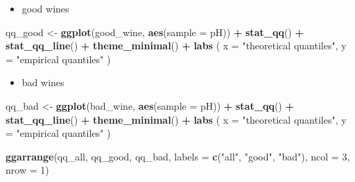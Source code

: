 \documentclass[
]{article}
\newenvironment{Shaded}{\begin{snugshade}}{\end{snugshade}}
\newcommand{\AttributeTok}[1]{\textcolor[rgb]{0.13,0.29,0.53}{#1}}
\newcommand{\DecValTok}[1]{\textcolor[rgb]{0.00,0.00,0.81}{#1}}
\newcommand{\FunctionTok}[1]{\textcolor[rgb]{0.13,0.29,0.53}{\textbf{#1}}}
\newcommand{\NormalTok}[1]{#1}
\newcommand{\OtherTok}[1]{\textcolor[rgb]{0.56,0.35,0.01}{#1}}
\newcommand{\SpecialCharTok}[1]{\textcolor[rgb]{0.81,0.36,0.00}{\textbf{#1}}}
\newcommand{\StringTok}[1]{\textcolor[rgb]{0.31,0.60,0.02}{#1}}
\providecommand{\tightlist}{%
  \setlength{\itemsep}{0pt}\setlength{\parskip}{0pt}}
\begin{document}
\begin{itemize}
\tightlist
\item
  good wines
\end{itemize}

\begin{Shaded}
\begin{Highlighting}[]
\NormalTok{qq\_good }\OtherTok{\textless{}{-}} \FunctionTok{ggplot}\NormalTok{(good\_wine, }\FunctionTok{aes}\NormalTok{(}\AttributeTok{sample =}\NormalTok{ pH)) }\SpecialCharTok{+}
  \FunctionTok{stat\_qq}\NormalTok{() }\SpecialCharTok{+}
  \FunctionTok{stat\_qq\_line}\NormalTok{() }\SpecialCharTok{+}
  \FunctionTok{theme\_minimal}\NormalTok{() }\SpecialCharTok{+}
  \FunctionTok{labs}\NormalTok{ (}
    \AttributeTok{x =} \StringTok{"theoretical quantiles"}\NormalTok{,}
    \AttributeTok{y =} \StringTok{"empirical quantiles"}
\NormalTok{  )}
\end{Highlighting}
\end{Shaded}

\begin{itemize}
\tightlist
\item
  bad wines
\end{itemize}

\begin{Shaded}
\begin{Highlighting}[]
\NormalTok{qq\_bad }\OtherTok{\textless{}{-}} \FunctionTok{ggplot}\NormalTok{(bad\_wine, }\FunctionTok{aes}\NormalTok{(}\AttributeTok{sample =}\NormalTok{ pH)) }\SpecialCharTok{+}
  \FunctionTok{stat\_qq}\NormalTok{() }\SpecialCharTok{+}
  \FunctionTok{stat\_qq\_line}\NormalTok{() }\SpecialCharTok{+}
  \FunctionTok{theme\_minimal}\NormalTok{() }\SpecialCharTok{+}
  \FunctionTok{labs}\NormalTok{ (}
    \AttributeTok{x =} \StringTok{"theoretical quantiles"}\NormalTok{,}
    \AttributeTok{y =} \StringTok{"empirical quantiles"}
\NormalTok{  )  }
\end{Highlighting}
\end{Shaded}

\begin{Shaded}
\begin{Highlighting}[]
\FunctionTok{ggarrange}\NormalTok{(qq\_all, qq\_good, qq\_bad, }\AttributeTok{labels =} \FunctionTok{c}\NormalTok{(}\StringTok{"all"}\NormalTok{, }\StringTok{"good"}\NormalTok{, }\StringTok{"bad"}\NormalTok{), }\AttributeTok{ncol =} \DecValTok{3}\NormalTok{, }\AttributeTok{nrow =} \DecValTok{1}\NormalTok{)}
\end{Highlighting}
\end{Shaded}
\end{document}
